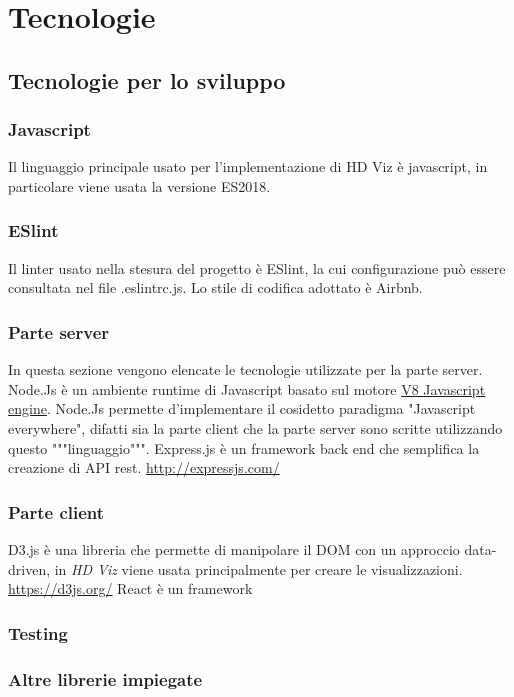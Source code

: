 \section{Tecnologie}
    \subsection{Tecnologie per lo sviluppo}
    \subsubsection{Javascript}
        Il linguaggio principale usato per l'implementazione di HD Viz è javascript, in particolare viene usata la versione ES2018.
    \subsubsection{ESlint}
        Il linter usato nella stesura del progetto è ESlint, la cui configurazione può essere consultata nel file .eslintrc.js. Lo stile di codifica adottato è Airbnb.
    \subsubsection{Parte server}
    In questa sezione vengono elencate le tecnologie utilizzate per la parte server.
        Node.Js è un ambiente runtime di Javascript basato sul motore \href{https://v8.dev/}{V8 Javascript engine}. Node.Js permette d'implementare il cosidetto paradigma "Javascript everywhere", difatti sia la parte client che la parte server sono scritte utilizzando questo """linguaggio""".
        Express.js è un framework back end che semplifica la creazione di API rest.
        \url{http://expressjs.com/}
    \subsubsection{Parte client}
        D3.js è una libreria che permette di manipolare il DOM con un approccio data-driven, in \textit{HD Viz} viene usata principalmente per creare le visualizzazioni.
        \url{https://d3js.org/}
        React è un framework
    \subsubsection{Testing}
    \subsubsection{Altre librerie impiegate}
